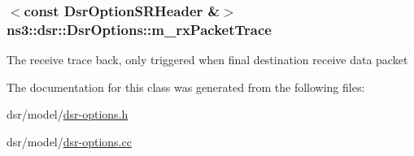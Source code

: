 \subsubsection[{\texorpdfstring{m\+\_\+rx\+Packet\+Trace}{m_rxPacketTrace}}]{$<$const {\bf Dsr\+Option\+S\+R\+Header} \&$>$ ns3\+::dsr\+::\+Dsr\+Options\+::m\+\_\+rx\+Packet\+Trace\hspace{0.3cm}{\ttfamily [protected]}}\hypertarget{classns3_1_1dsr_1_1DsrOptions_a0c5d1c93d0a35c7e0049494377d16aa6}{}\label{classns3_1_1dsr_1_1DsrOptions_a0c5d1c93d0a35c7e0049494377d16aa6}
The receive trace back, only triggered when final destination receive data packet 

The documentation for this class was generated from the following files\+:\begin{DoxyCompactItemize}
\item 
dsr/model/\hyperlink{dsr-options_8h}{dsr-\/options.\+h}\item 
dsr/model/\hyperlink{dsr-options_8cc}{dsr-\/options.\+cc}\end{DoxyCompactItemize}
